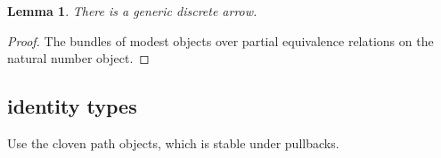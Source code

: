 \documentclass{amsart}
\theoremstyle{plain}
\newtheorem{lemma}[theorem]{Lemma}
\theoremstyle{definition}
\newcommand\hide[1]{}
\begin{document}
\begin{lemma} There is a generic discrete arrow. \end{lemma}

\begin{proof} The bundles of modest objects over partial equivalence relations on the natural number object. \end{proof}



\subsection{identity types}
Use the cloven path objects, which is stable under pullbacks.

\hide{meest vervelende deel van het verhaal: de theorie van discrete objecten.}
\end{document}
